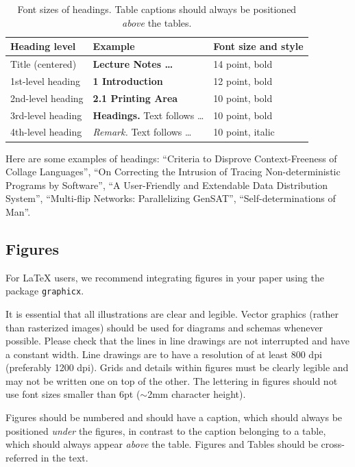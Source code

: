\documentclass[runningheads]{llncs}
\begin{document}
\begin{table}[tb]
  \caption{Font sizes of headings. 
    Table captions should always be positioned \emph{above} the tables.
  }
  \label{tab:headings}
  \centering
  \begin{tabular}{@{}lll@{}}
    \toprule
    Heading level & Example & Font size and style\\
    \midrule
    Title (centered)  & {\Large\bf Lecture Notes \dots} & 14 point, bold\\
    1st-level heading & {\large\bf 1 Introduction} & 12 point, bold\\
    2nd-level heading & {\bf 2.1 Printing Area} & 10 point, bold\\
    3rd-level heading & {\bf Headings.} Text follows \dots & 10 point, bold\\
    4th-level heading & {\it Remark.} Text follows \dots & 10 point, italic\\
  \bottomrule
  \end{tabular}
\end{table}

Here are some examples of headings: 
``Criteria to Disprove Context-Freeness of Collage Languages'', ``On Correcting the Intrusion of Tracing Non-deterministic Programs by Software'', ``A User-Friendly and Extendable Data Distribution System'', ``Multi-flip Networks: Parallelizing GenSAT'', ``Self-determinations of Man''.


\subsection{Figures}
\label{sect:figures}
For \LaTeX{} users, we recommend integrating figures in your paper using the package \texttt{graphicx}.

It is essential that all illustrations are clear and legible. 
Vector graphics (rather than rasterized images) should be used for diagrams and schemas whenever possible. 
Please check that the lines in line drawings are not interrupted and have a constant width. 
Line drawings are to have a resolution of at least 800 dpi (preferably 1200 dpi).
Grids and details within figures must be clearly legible and may not be written one on top of the other. 
The lettering in figures should not use font sizes smaller than 6\:pt ($\sim$2\:mm character height). 

Figures should be numbered and should have a caption, which should always be positioned \emph{under} the figures, in contrast to the caption belonging to a table, which should always appear \emph{above} the table.
Figures and Tables should be cross-referred in the text.
\end{document}
